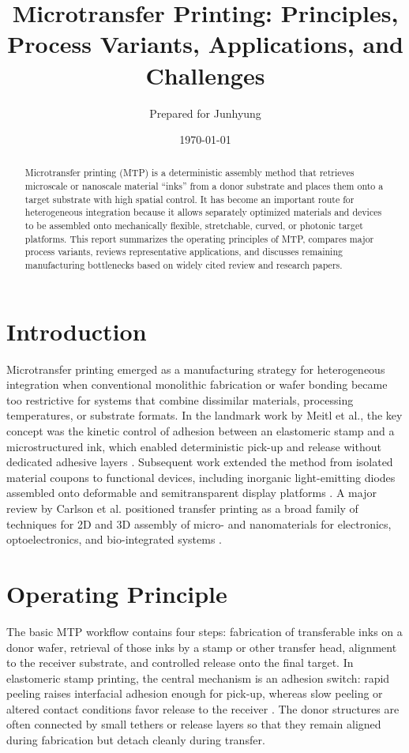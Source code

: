 \documentclass[11pt,a4paper]{article}
\title{Microtransfer Printing: Principles, Process Variants, Applications, and Challenges}
\author{Prepared for Junhyung}
\date{\today}
\begin{document}
\maketitle

\begin{abstract}
Microtransfer printing (MTP) is a deterministic assembly method that retrieves microscale or nanoscale material ``inks'' from a donor substrate and places them onto a target substrate with high spatial control. It has become an important route for heterogeneous integration because it allows separately optimized materials and devices to be assembled onto mechanically flexible, stretchable, curved, or photonic target platforms. This report summarizes the operating principles of MTP, compares major process variants, reviews representative applications, and discusses remaining manufacturing bottlenecks based on widely cited review and research papers.
\end{abstract}

\section{Introduction}
Microtransfer printing emerged as a manufacturing strategy for heterogeneous integration when conventional monolithic fabrication or wafer bonding became too restrictive for systems that combine dissimilar materials, processing temperatures, or substrate formats. In the landmark work by Meitl et al., the key concept was the kinetic control of adhesion between an elastomeric stamp and a microstructured ink, which enabled deterministic pick-up and release without dedicated adhesive layers \cite{meitl2006}. Subsequent work extended the method from isolated material coupons to functional devices, including inorganic light-emitting diodes assembled onto deformable and semitransparent display platforms \cite{park2009}. A major review by Carlson et al. positioned transfer printing as a broad family of techniques for 2D and 3D assembly of micro- and nanomaterials for electronics, optoelectronics, and bio-integrated systems \cite{carlson2012}.

\section{Operating Principle}
The basic MTP workflow contains four steps: fabrication of transferable inks on a donor wafer, retrieval of those inks by a stamp or other transfer head, alignment to the receiver substrate, and controlled release onto the final target. In elastomeric stamp printing, the central mechanism is an adhesion switch: rapid peeling raises interfacial adhesion enough for pick-up, whereas slow peeling or altered contact conditions favor release to the receiver \cite{meitl2006}. The donor structures are often connected by small tethers or release layers so that they remain aligned during fabrication but detach cleanly during transfer.
\end{document}

